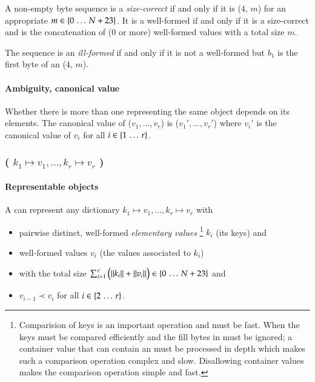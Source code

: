 A non-empty byte sequence  is a \emph{size-correct} \DborSequenceValue{}
if and only if it is
\DborIntegerToken*($4$, $m$) {\Concat}  for an appropriate
$m \in \{0 \,\ldots\, N + 23\}$.
It is a well-formed \DborSequenceValue{} if and only if it is a size-correct \DborSequenceValue{} and
 is the concatenation of ($0$ or more)
well-formed values with a total size $m$.

The sequence is an \emph{ill-formed} \DborSequenceValue{} if and only if it is not a well-formed
\DborSequenceValue{} but $b_1$ is the first byte of an \DborIntegerToken*($4$, $m$).

\paragraph{Ambiguity, canonical value}

Whether there is more than one \DborSequenceValue{} representing the same object depends on its
elements.
The canonical value of \DborSequenceValue{}($v_1, \ldots, v_r$) is
\DborSequenceValue($v_1', \ldots, v_r'$)
where $v_i'$ is the canonical value of $v_i$ for all $i \in \{1 \,\ldots\, r\}$.


\subsubsection{\DborDictionaryValue(\texorpdfstring{%
    $k_1 \mapsto v_1, \ldots, k_r \mapsto v_r$%
}{%
    k1 -> v1, ..., kr -> vr%
})}
\hypertarget{sec:def:DictionaryValue}{}

\paragraph{Representable objects}

A \DborDictionaryValue{} can represent any dictionary $k_1 \mapsto v_1, \ldots, k_r \mapsto v_r$ with
\begin{itemize}
    \item
    pairwise distinct, well-formed \emph{elementary values}%
    \footnote{
        Comparision of keys is an important operation and must be fast.
        When the keys must be compared efficiently and the fill bytes in \DborAllocatedValue*{} must be
        ignored; a container value that can contain an \DborAllocatedValue*{} must be processed in depth
        which makes such a comparison operation complex and slow.
        Disallowing container values makes the comparison operation simple and fast.
    }
    $k_i$ (its keys) and

    \item
    well-formed values $v_i$ (the values associated to $k_i$)

    \item
    with the total size $\sum_{i = 1}^r \big(\|k_i\| + \|v_i\|\big) \in \{0 \,\ldots\, N + 23\}$ and

    \item
    $v_{i - 1} \prec v_{i}$ for all $i \in \{2 \,\ldots\, r\}$.
\end{itemize}

